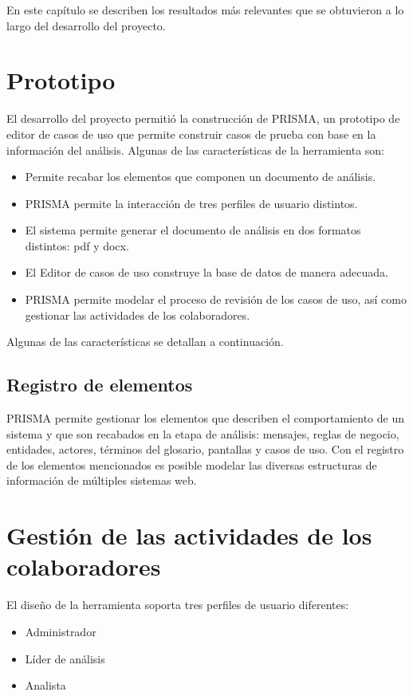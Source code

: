 En este capítulo se describen los resultados más relevantes que se obtuvieron a lo largo del desarrollo del proyecto. 

\section{Prototipo}
El desarrollo del proyecto permitió la construcción de PRISMA, un prototipo de editor de casos de uso que permite construir casos de prueba con base en la información del análisis. Algunas de las
características de la herramienta son:

\begin{itemize}
 \item Permite recabar los elementos que componen un documento de análisis.
 \item PRISMA permite la interacción de tres perfiles de usuario distintos.
 \item El sistema permite generar el documento de análisis en dos formatos distintos: pdf y docx.
 \item El Editor de casos de uso construye la base de datos de manera adecuada.
 \item PRISMA permite modelar el proceso de revisión de los casos de uso, así como gestionar las actividades de los colaboradores.
\end{itemize}

Algunas de las características se detallan a continuación.

\subsection*{Registro de elementos}
PRISMA permite gestionar los elementos que describen el comportamiento de un sistema y que son recabados en la etapa de análisis: mensajes, reglas de negocio, entidades, actores, términos del glosario, pantallas y casos de uso. Con el registro 
de los elementos mencionados es posible modelar las diversas estructuras de información de múltiples sistemas web. 

\section*{Gestión de las actividades de los colaboradores}
El diseño de la herramienta soporta tres perfiles de usuario diferentes:
\begin{itemize}
 \item Administrador 
 \item Líder de análisis
 \item Analista
\end{itemize}

